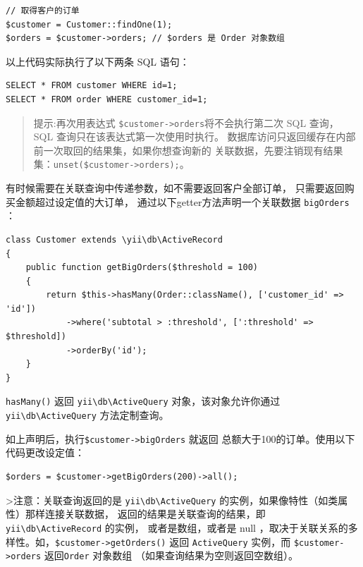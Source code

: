 \lstset{language=php}\begin{lstlisting}
// 取得客户的订单
$customer = Customer::findOne(1);
$orders = $customer->orders; // $orders 是 Order 对象数组
\end{lstlisting}
以上代码实际执行了以下两条 SQL 语句：

\lstset{language=sql}\begin{lstlisting}
SELECT * FROM customer WHERE id=1;
SELECT * FROM order WHERE customer_id=1;
\end{lstlisting}
\begin{quote}提示:再次用表达式 \lstinline|$customer->orders|将不会执行第二次 SQL 查询，
SQL 查询只在该表达式第一次使用时执行。
数据库访问只返回缓存在内部前一次取回的结果集，如果你想查询新的
关联数据，先要注销现有结果集：\lstinline|unset($customer->orders);|。

\end{quote}
有时候需要在关联查询中传递参数，如不需要返回客户全部订单，
只需要返回购买金额超过设定值的大订单，
通过以下getter方法声明一个关联数据 \lstinline|bigOrders| ：

\lstset{language=php}\begin{lstlisting}
class Customer extends \yii\db\ActiveRecord
{
    public function getBigOrders($threshold = 100)
    {
        return $this->hasMany(Order::className(), ['customer_id' => 'id'])
            ->where('subtotal > :threshold', [':threshold' => $threshold])
            ->orderBy('id');
    }
}
\end{lstlisting}
\lstinline|hasMany()| 返回 \texttt{yii{\allowbreak{}\textbackslash}db{\allowbreak{}\textbackslash}ActiveQuery} 对象，该对象允许你通过
\texttt{yii{\allowbreak{}\textbackslash}db{\allowbreak{}\textbackslash}ActiveQuery} 方法定制查询。

如上声明后，执行\lstinline|$customer->bigOrders| 就返回
总额大于100的订单。使用以下代码更改设定值：

\lstset{language=php}\begin{lstlisting}
$orders = $customer->getBigOrders(200)->all();
\end{lstlisting}
>注意：关联查询返回的是 \texttt{yii{\allowbreak{}\textbackslash}db{\allowbreak{}\textbackslash}ActiveQuery} 的实例，如果像特性（如类属性）那样连接关联数据，
返回的结果是关联查询的结果，即 \texttt{yii{\allowbreak{}\textbackslash}db{\allowbreak{}\textbackslash}ActiveRecord} 的实例，
或者是数组，或者是 null ，取决于关联关系的多样性。如，\lstinline|$customer->getOrders()| 返回
\lstinline|ActiveQuery| 实例，而 \lstinline|$customer->orders| 返回\lstinline|Order| 对象数组
（如果查询结果为空则返回空数组）。

